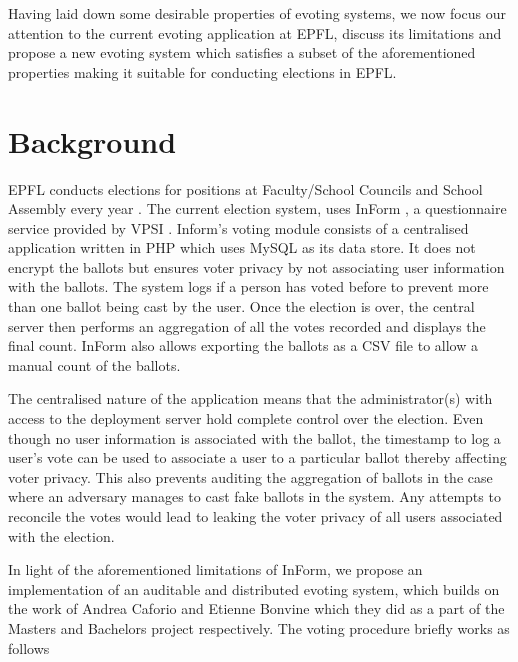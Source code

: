 Having laid down some desirable properties of evoting systems, we now focus our attention to the current evoting application at EPFL, discuss its limitations and propose a new evoting system which satisfies a subset of the aforementioned properties making it suitable for conducting elections in EPFL.

\section {Background}

EPFL conducts elections for positions at Faculty/School Councils and School Assembly every year \cite{assemblyEPFL}. The current election system, uses InForm \cite{inform}, a questionnaire service provided by VPSI \cite{vpsi}. Inform's voting module consists of a centralised application written in PHP which uses MySQL as its data store. It does not encrypt the ballots but ensures voter privacy by not associating user information with the ballots. The system logs if a person has voted before to prevent more than one ballot being cast by the user. Once the election is over, the central server then performs an aggregation of all the votes recorded and displays the final count. InForm also allows exporting the ballots as a CSV file to allow a manual count of the ballots.

The centralised nature of the application means that the administrator(s) with access to the deployment server hold complete control over the election. Even though no user information is associated with the ballot, the timestamp to log a user's vote can be used to associate a user to a particular ballot thereby affecting voter privacy. This also prevents auditing the aggregation of ballots in the case where an adversary manages to cast fake ballots in the system. Any attempts to reconcile the votes would lead to leaking the voter privacy of all users associated with the election.

In light of the aforementioned limitations of InForm, we propose an implementation of an auditable and distributed evoting system, which builds on the work of Andrea Caforio \cite{andrea} and Etienne Bonvine \cite{etienne} which they did as a part of the Masters and Bachelors project respectively. The voting procedure briefly works as follows

